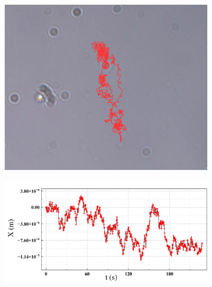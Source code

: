 \documentclass[a4paper]{report} %
\begin{document}
\begin{figure}[H]
    \centering
    \begin{subfigure}{0.3\textwidth}
        \includegraphics[width=\linewidth]{image1.png}
    \end{subfigure}
    \begin{subfigure}{0.6\textwidth}
        \includegraphics[width=\linewidth]{image2.png}
    \end{subfigure}


\end{figure}
\end{document}
